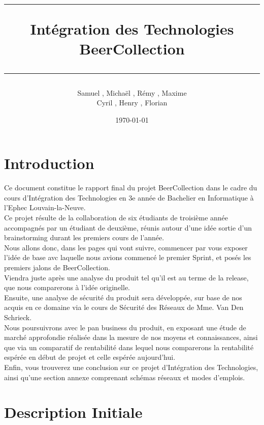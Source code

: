 \documentclass{report}
\title{
\parbox{15cm}
{ \vspace{3cm}
	\begin{center}\sf\bfseries\Huge
		\rule{15cm}{1pt}
		\medskip
		Intégration des Technologies\\
		\huge BeerCollection
		\vspace{.5cm}
		\rule{15cm}{1pt}
	\end{center}
	\vspace{3cm}
 }}
\author{Samuel \bsc{Monroe}, Michaël \bsc{Riffon}, Rémy \bsc{Voet}, Maxime \bsc{Grenier}\\
 Cyril \bsc{Pierret}, Henry \bsc{Christophe}, Florian \bsc{Feignaert}}
\date{\today}
\begin{document}
\maketitle

\newpage
\thispagestyle{empty}
\mbox{}

\tableofcontents

\chapter{Introduction} %

	 Ce document constitue le rapport final du projet BeerCollection dans le cadre du cours d'Intégration des Technologies en 3e année de Bachelier en Informatique à l'Ephec Louvain-la-Neuve.\\
	 Ce projet résulte de la collaboration de six étudiants de troisième année accompagnés par un étudiant de deuxième, réunis autour d'une idée sortie d'un brainstorming durant les premiers cours de l'année.\\

	 Nous allons donc, dans les pages qui vont suivre, commencer par vous exposer l'idée de base avc laquelle nous avions commencé le premier Sprint, et posés les premiers jalons de BeerCollection.\\
	 Viendra juste après une analyse du produit tel qu'il est au terme de la release, que nous comparerons à l'idée originelle.\\

	 Ensuite, une analyse de sécurité du produit sera développée, sur base de nos acquis en ce domaine via le cours de Sécurité des Réseaux de Mme. Van Den Schrieck.\\

	 Nous poursuivrons avec le pan business du produit, en exposant une étude de marché approfondie réalisée dans la mesure de nos moyens et connaissances, ainsi que via un comparatif de rentabilité dans lequel nous comparerons la rentabilité espérée en début de projet et celle espérée aujourd'hui.\\

	 Enfin, vous trouverez une conclusion sur ce projet d'Intégration des Technologies, ainsi qu'une section annexe comprenant schémas réseaux et modes d'emplois.\\

	
\chapter{Description Initiale} %
\end{document}
